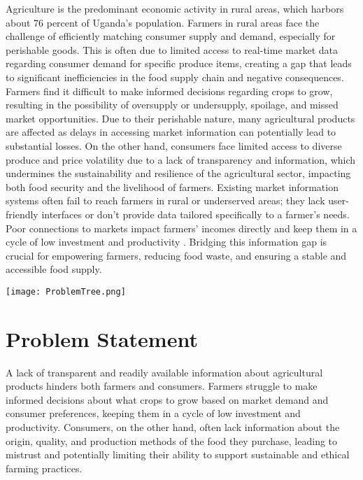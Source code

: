 \documentclass[12pt, a4paper]{article}
\begin{document}
Agriculture is the predominant economic activity in rural areas, which harbors about 76 percent of Uganda's population. Farmers in rural areas face the challenge of efficiently matching consumer supply and demand, especially for perishable goods. This is often due to limited access to real-time market data regarding consumer demand for specific produce items, creating a gap that leads to significant inefficiencies in the food supply chain and negative consequences. Farmers find it difficult to make informed decisions regarding crops to grow, resulting in the possibility of oversupply or undersupply, spoilage, and missed market opportunities. Due to their perishable nature, many agricultural products are affected as delays in accessing market information can potentially lead to substantial losses. On the other hand, consumers face limited access to diverse produce and price volatility due to a lack of transparency and information, which undermines the sustainability and resilience of the agricultural sector, impacting both food security and the livelihood of farmers. Existing market information systems often fail to reach farmers in rural or underserved areas; they lack user-friendly interfaces or don't provide data tailored specifically to a farmer’s needs. Poor connections to markets impact farmers’ incomes directly and keep them in a cycle of low investment and productivity \citep{WorldBank2020}. Bridging this information gap is crucial for empowering farmers, reducing food waste, and ensuring a stable and accessible food supply.

\begin{center}
    \texttt{[image: ProblemTree.png]}
\end{center}

\newpage

\section*{Problem Statement}

A lack of transparent and readily available information about agricultural products hinders both farmers and consumers. Farmers struggle to make informed decisions about what crops to grow based on market demand and consumer preferences, keeping them in a cycle of low investment and productivity. Consumers, on the other hand, often lack information about the origin, quality, and production methods of the food they purchase, leading to mistrust and potentially limiting their ability to support sustainable and ethical farming practices.
\end{document}
